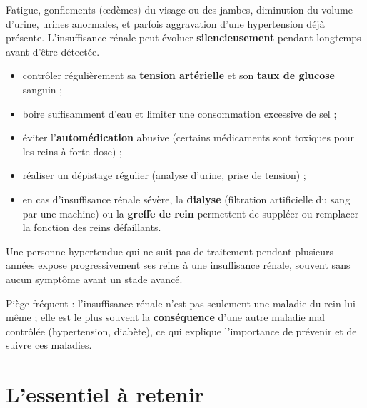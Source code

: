 \begin{propriete}[Symptômes]
Fatigue, gonflements (œdèmes) du visage ou des jambes, diminution du volume
d'urine, urines anormales, et parfois aggravation d'une hypertension déjà présente.
L'insuffisance rénale peut évoluer \textbf{silencieusement} pendant longtemps avant
d'être détectée.
\end{propriete}

\begin{propriete}
\begin{itemize}
\item contrôler régulièrement sa \textbf{tension artérielle} et son \textbf{taux de
glucose} sanguin ;
\item boire suffisamment d'eau et limiter une consommation excessive de sel ;
\item éviter l'\textbf{automédication} abusive (certains médicaments sont toxiques
pour les reins à forte dose) ;
\item réaliser un dépistage régulier (analyse d'urine, prise de tension) ;
\item en cas d'insuffisance rénale sévère, la \textbf{dialyse} (filtration
artificielle du sang par une machine) ou la \textbf{greffe de rein} permettent de
suppléer ou remplacer la fonction des reins défaillants.
\end{itemize}
\end{propriete}

\begin{exemple}
Une personne hypertendue qui ne suit pas de traitement pendant plusieurs années
expose progressivement ses reins à une insuffisance rénale, souvent sans aucun
symptôme avant un stade avancé.
\end{exemple}

\begin{remarque}
Piège fréquent : l'insuffisance rénale n'est pas seulement une maladie du rein
lui-même ; elle est le plus souvent la \textbf{conséquence} d'une autre maladie mal
contrôlée (hypertension, diabète), ce qui explique l'importance de prévenir et de
suivre ces maladies.
\end{remarque}

\section{L'essentiel à retenir}

